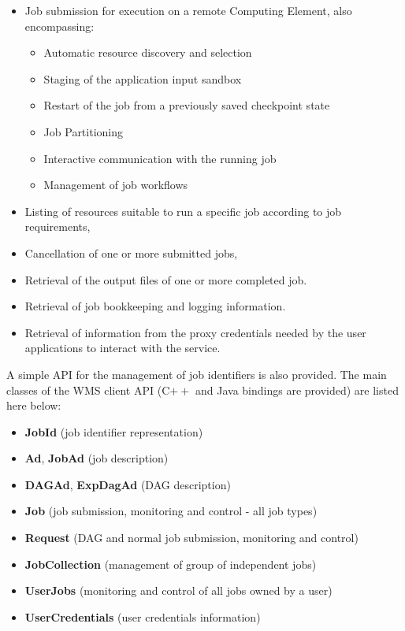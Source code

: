 \documentclass{egee}
\begin{document}
\begin{itemize}
 \item Job submission for execution on a remote Computing Element, also encompassing: 
 \begin{itemize}                   
    \item Automatic resource discovery and selection
    \item Staging of the application input sandbox
    \item Restart of the job from a previously saved checkpoint state
    \item Job Partitioning
    \item Interactive communication with the running job
    \item Management of job workflows
 \end{itemize}
 \item Listing of resources suitable to run a specific job according to job requirements,
 \item Cancellation of one or more submitted jobs,
 \item Retrieval of the output files of one or more completed job.
 \item Retrieval of job bookkeeping and logging information.
 \item Retrieval of information from the proxy credentials needed by the user applications to interact 
       with the service.
\end{itemize}

A simple API for the management of job identifiers is also provided.
The main classes of the WMS client API (C$++$ and Java bindings are provided) are listed here below:
	       
\begin{itemize}
    \item \textbf{JobId}             		(job identifier representation)
    \item \textbf{Ad}, \textbf{JobAd}           (job description)
    \item \textbf{DAGAd}, \textbf{ExpDagAd}     (DAG description)
    \item \textbf{Job}                          (job submission, monitoring and control - all job types)
    \item \textbf{Request}                      (DAG and normal job submission, monitoring and control)
    \item \textbf{JobCollection}                (management of group of independent jobs)
    \item \textbf{UserJobs}                     (monitoring and control of all jobs owned by a user)
    \item \textbf{UserCredentials}              (user credentials information) 
\end{itemize}
\end{document}
